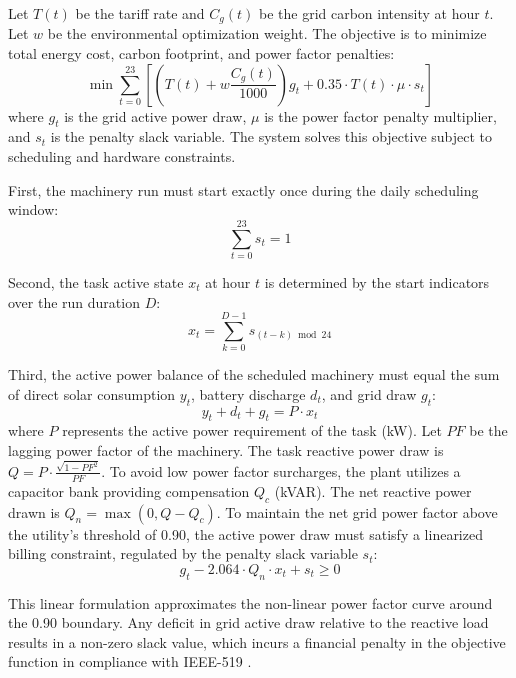 \documentclass[journal]{IEEEtran}
\begin{document}
Let $T(t)$ be the tariff rate and $C_g(t)$ be the grid carbon intensity at hour $t$. Let $w$ be the environmental optimization weight. The objective is to minimize total energy cost, carbon footprint, and power factor penalties:
\begin{equation}
\min \sum_{t=0}^{23} \left[ \left( T(t) + w \frac{C_g(t)}{1000} \right) g_t + 0.35 \cdot T(t) \cdot \mu \cdot s_t \right]
\label{eq:objective}
\end{equation}
where $g_t$ is the grid active power draw, $\mu$ is the power factor penalty multiplier, and $s_t$ is the penalty slack variable. The system solves this objective subject to scheduling and hardware constraints.

First, the machinery run must start exactly once during the daily scheduling window:
\begin{equation}
\sum_{t=0}^{23} s_t = 1
\label{eq:start_indicator}
\end{equation}

Second, the task active state $x_t$ at hour $t$ is determined by the start indicators over the run duration $D$:
\begin{equation}
x_t = \sum_{k=0}^{D-1} s_{(t-k) \bmod 24}
\label{eq:state_constraint}
\end{equation}

Third, the active power balance of the scheduled machinery must equal the sum of direct solar consumption $y_t$, battery discharge $d_t$, and grid draw $g_t$:
\begin{equation}
y_t + d_t + g_t = P \cdot x_t
\label{eq:power_balance}
\end{equation}
where $P$ represents the active power requirement of the task (kW). Let $PF$ be the lagging power factor of the machinery. The task reactive power draw is $Q = P \cdot \frac{\sqrt{1 - PF^2}}{PF}$. To avoid low power factor surcharges, the plant utilizes a capacitor bank providing compensation $Q_c$ (kVAR). The net reactive power drawn is $Q_n = \max(0, Q - Q_c)$. To maintain the net grid power factor above the utility's threshold of 0.90, the active power draw must satisfy a linearized billing constraint, regulated by the penalty slack variable $s_t$:
\begin{equation}
g_t - 2.064 \cdot Q_n \cdot x_t + s_t \ge 0
\label{eq:pf_constraint}
\end{equation}

This linear formulation approximates the non-linear power factor curve around the 0.90 boundary. Any deficit in grid active draw relative to the reactive load results in a non-zero slack value, which incurs a financial penalty in the objective function in compliance with IEEE-519 \cite{ref3}.
\end{document}
